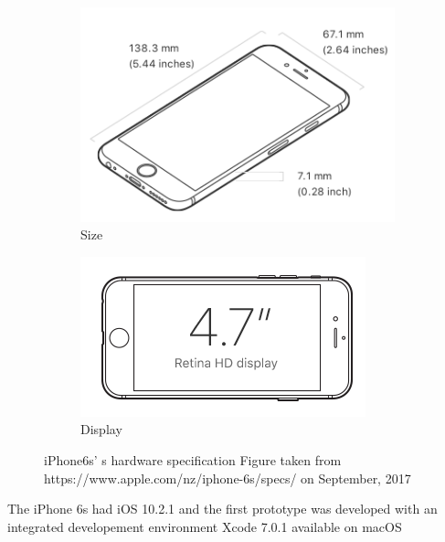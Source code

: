 \begin{figure}[!hbt]\centering
    \begin{subfigure}{0.4\textwidth}
\includegraphics[width=\textwidth]{hw1}
\caption{Size}
    \end{subfigure}\hspace{0.05\textwidth}
 \begin{subfigure}{0.4\textwidth}
\includegraphics[width=\textwidth]{hw2}
\caption{Display}
 \end{subfigure}\hspace{0.05\textwidth}
  \caption{iPhone6s' s hardware specification \newline Figure taken from https://www.apple.com/nz/iphone-6s/specs/ on September, 2017}
\end{figure}

The iPhone 6s had iOS 10.2.1 and the first prototype was developed with an integrated developement environment Xcode 7.0.1 available on macOS

